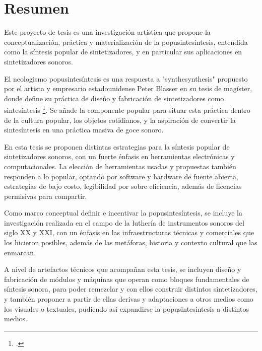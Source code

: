 \documentclass[../proyecto.tex]{subfiles}
\begin{document}
\section{Resumen}

Este proyecto de tesis es una investigación artística que propone la conceptualización, práctica y materialización de la popusintesíntesis, entendida como la síntesis popular de sintetizadores, y en particular sus aplicaciones en sintetizadores sonoros.

El neologismo popusintesíntesis es una respuesta a "synthesynthesis" propuesto por el artista y empresario estadounidense Peter Blasser en su tesis de magíster, donde define su práctica de diseño y fabricación de sintetizadores como sintesíntesis \footcite{blasser_stores_2005}. Se añade la componente popular para situar esta práctica dentro de la cultura popular, los objetos cotidianos, y la aspiración de convertir la sintesíntesis en una práctica masiva de goce sonoro.

En esta tesis se proponen distintas estrategias para la síntesis popular de sintetizadores sonoros, con un fuerte énfasis en herramientas electrónicas y computacionales. La elección de herramientas usadas y propuestas también responden a lo popular, optando por software y hardware de fuente abierta, estrategias de bajo costo, legibilidad por sobre eficiencia, además de licencias permisivas para compartir.

Como marco conceptual definir e incentivar la popusintesíntesis, se incluye la investigación realizada en el campo de la luthería de instrumentos sonoros del siglo XX y XXI, con un énfasis en las infraestructuras técnicas y comerciales que los hicieron posibles, además de las metáforas, historia y contexto cultural que las enmarcan.

A nivel de artefactos técnicos que acompañan esta tesis, se incluyen diseño y fabricación de módulos y máquinas que operan como bloques fundamentales de síntesis sonora, para poder remezclar y con ellos construir distintos sintetizadores, y también proponer a partir de ellas derivas y adaptaciones a otros medios como los visuales o textuales, pudiendo así expandirse la popusintesíntesis a distintos medios.

\end{document}
